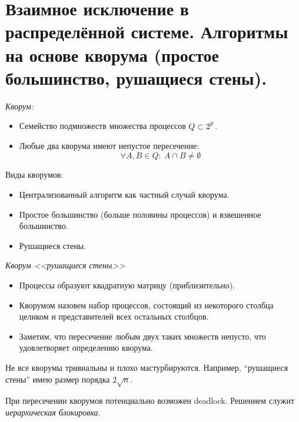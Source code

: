 \section{Взаимное исключение в распределённой системе.
Алгоритмы на основе кворума (простое большинство, рушащиеся стены).}

\begin{definition} \textit{Кворум:}
    \begin{itemize}
        \item Семейство подмножеств множества процессов $Q \subset 2^{\mathbb{P}}$.
        \item Любые два кворума имеют непустое пересечение:
            \[
                \forall A, B \in Q\colon~ A \cap B \neq \emptyset
            \]
    \end{itemize}
\end{definition}

\begin{examples} Виды кворумов:
    \begin{itemize}
        \item Централизованный алгоритм как частный случай кворума.
        \item Простое большинство (больше половины процессов) и взвешенное большинство.
        \item Рушащиеся стены.
    \end{itemize}
\end{examples}

\begin{definition} \textit{Кворум <<рушащиеся стены>>}
    \begin{itemize}
        \item Процессы образуют квадратную матрицу (приблизительно).
        \item Кворумом назовем набор процессов, состоящий из некоторого столбца 
            целиком и представителей всех остальных столбцов.
        \item Заметим, что пересечение любым двух таких множеств непусто, что 
            удовлетворяет определению кворума.
    \end{itemize}
\end{definition}

\begin{remark}
    Не все кворумы тривиальны и плохо мастурбируются. Например, ``рушащиеся стены''
    имею размер порядка $2\sqrt{n}$.
\end{remark}

\begin{remark}
    При пересечении кворумов потенциально возможен deadlock. Решением служит 
    \textit{иерархическая блокировка}.
\end{remark}
